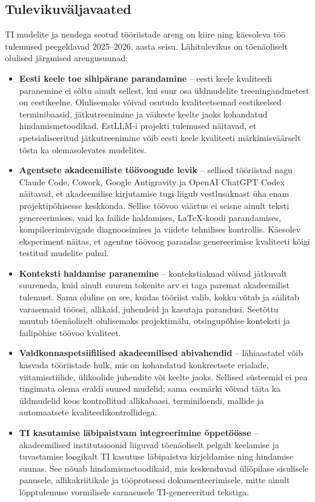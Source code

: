 \subsection{Tulevikuväljavaated} \label{subsec:tulevikuvaljavaated}

TI mudelite ja nendega seotud tööriistade areng on kiire ning käesoleva töö tulemused peegeldavad 2025--2026. aasta seisu. Lähitulevikus on tõenäoliselt olulised järgmised arengusuunad:

\begin{itemize}
    \item \textbf{Eesti keele toe sihipärane parandamine} -- eesti keele kvaliteedi paranemine ei sõltu ainult sellest, kui suur osa üldmudelite treeningandmetest on eestikeelne. Olulisemaks võivad osutuda kvaliteetsemad eestikeelsed terminibaasid, jätkutreenimine ja väikeste keelte jaoks kohandatud hindamismetoodikad. EstLLM-i projekti \cite{dorkin2026estllm} tulemused näitavad, et spetsialiseeritud jätkutreenimine võib eesti keele kvaliteeti märkimisväärselt tõsta ka olemasolevates mudelites.
    \item \textbf{Agentsete akadeemiliste töövoogude levik} -- sellised tööriistad nagu Claude Code, Cowork, Google Antigravity ja OpenAI ChatGPT Codex näitavad, et akadeemilise kirjutamise tugi liigub vestlusaknast üha enam projektipõhisesse keskkonda. Sellise töövoo väärtus ei seisne ainult teksti genereerimises, vaid ka failide haldamises, \LaTeX{}-koodi parandamises, kompileerimisvigade diagnoosimises ja viidete tehnilises kontrollis. Käesolev eksperiment näitas, et agentne töövoog parandas genereerimise kvaliteeti kõigi testitud mudelite puhul.
    \item \textbf{Konteksti haldamise paranemine} -- kontekstiaknad võivad jätkuvalt suureneda, kuid ainult suurem tokenite arv ei taga paremat akadeemilist tulemust. Sama oluline on see, kuidas tööriist valib, kokku võtab ja säilitab varasemaid tööosi, allikaid, juhendeid ja kasutaja parandusi. Seetõttu muutub tõenäoliselt olulisemaks projektimälu, otsingupõhise konteksti ja failipõhise töövoo kvaliteet.
    \item \textbf{Valdkonnaspetsiifilised akadeemilised abivahendid} -- lähiaastatel võib kasvada tööriistade hulk, mis on kohandatud konkreetsete erialade, viitamisstiilide, ülikoolide juhendite või keelte jaoks. Sellised süsteemid ei pea tingimata olema eraldi suured mudelid; sama eesmärki võivad täita ka üldmudelid koos kontrollitud allikabaasi, terminiloendi, mallide ja automaatsete kvaliteedikontrollidega.
    \item \textbf{TI kasutamise läbipaistvam integreerimine õppetöösse} -- akadeemilised institutsioonid liiguvad tõenäoliselt pelgalt keelamise ja tuvastamise loogikalt TI kasutuse läbipaistva kirjeldamise ning hindamise suunas. See nõuab hindamismetoodikaid, mis keskenduvad üliõpilase sisulisele panusele, allikakriitikale ja tööprotsessi dokumenteerimisele, mitte ainult lõpptulemuse vormilisele sarnasusele TI-genereeritud tekstiga.
\end{itemize}


